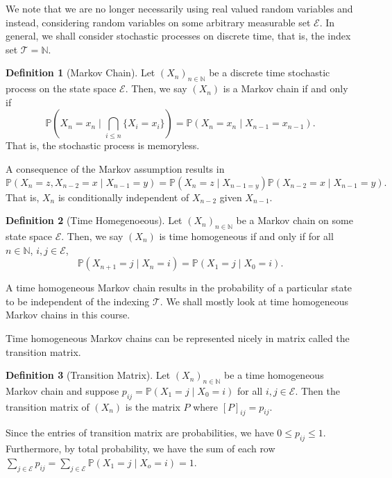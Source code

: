 \documentclass[
]{article}
\theoremstyle{definition}
\newtheorem{definition}{Definition}[section]
\begin{document}
We note that we are no longer necessarily using real valued random
variables and instead, considering random variables on some arbitrary
measurable set \(\mathcal{E}\). In general, we shall consider stochastic
processes on discrete time, that is, the index set
\(\mathcal{T} = \mathbb{N}\).

\begin{definition}[Markov Chain]
  Let \((X_n)_{n \in \mathbb{N}}\) be a discrete time stochastic process on 
  the state space \(\mathcal{E}\). Then, we say \((X_n)\) is a Markov chain if 
  and only if 
  \[\mathbb{P}(X_n = x_n \mid \bigcap_{i \le n} \{X_i = x_i\}) = 
    \mathbb{P}(X_n = x_n \mid X_{n - 1} = x_{n - 1}).\]
  That is, the stochastic process is memoryless.
\end{definition}

A consequence of the Markov assumption results in
\[\mathbb{P}(X_n = z, X_{n - 2} = x \mid X_{n - 1} = y) = 
  \mathbb{P}(X_n = z \mid X_{n - 1 = y})\mathbb{P}(X_{n - 2} = x \mid X_{n - 1} = y).\]
That is, \(X_n\) is conditionally independent of \(X_{n - 2}\) given
\(X_{n - 1}\).

\begin{definition}[Time Homegenoeous]
  Let \((X_n)_{n \in \mathbb{N}}\) be a Markov chain on some state space 
  \(\mathcal{E}\). Then, we say \((X_n)\) is time homogeneous if and only if 
  for all \(n \in \mathbb{N}\), \(i, j \in \mathcal{E}\), 
  \[\mathbb{P}(X_{n + 1} = j \mid X_n = i) = \mathbb{P}(X_1 = j \mid X_0 = i).\]
\end{definition}

A time homogeneous Markov chain results in the probability of a
particular state to be independent of the indexing \(\mathcal{T}\). We
shall mostly look at time homogeneous Markov chains in this course.

Time homogeneous Markov chains can be represented nicely in matrix
called the transition matrix.

\begin{definition}[Transition Matrix]
  Let \((X_n)_{n \in \mathbb{N}}\) be a time homogeneous Markov chain and suppose 
  \(p_{ij} = \mathbb{P}(X_1 = j \mid X_0 = i)\) for all \(i, j \in \mathcal{E}\). 
  Then the transition matrix of \((X_n)\) is the matrix \(P\) where 
  \([P]_{ij} = p_{ij}\).
\end{definition}

Since the entries of transition matrix are probabilities, we have
\(0 \le p_{ij} \le 1\). Furthermore, by total probability, we have the
sum of each row
\(\sum_{j \in \mathcal{E}} p_{ij} =  \sum_{j \in \mathcal{E}} \mathbb{P}(X_1 = j \mid X_o = i) = 1\).
\end{document}
